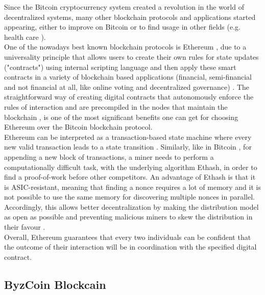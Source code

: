 Since the Bitcoin cryptocurrency system created a revolution in the world of decentralized systems, many other blockchain protocols and applications started appearing, either to improve on Bitcoin or to find usage in other fields (e.g. health care \cite{Health}).\\
\newline
One of the nowadays best known blockchain protocols is Ethereum \cite{Ethereum}, due to a universality principle that allows users to create their own rules for state updates ("contracts") using internal scripting language and then apply these smart contracts in a variety of blockchain based applications (financial, semi-financial and not financial at all, like online voting and decentralized governance) \cite{Ethereum}.
\newline
The straightforward way of creating digital contracts that autonomously enforce the rules of interaction and are precompiled in the nodes that maintain the blockchain \cite{Ethereum}, is one of the most significant benefits one can get for choosing Ethereum over the Bitcoin blockchain protocol.\\
\newline
Ethereum can be interpreted as a transaction-based state machine where every new valid transaction leads to a state transition \cite{Ethereum}. Similarly, like in Bitcoin \cite{Bitcoin}, for appending a new block of transactions, a miner needs to perform a computationally difficult task, with the underlying algorithm Ethash, in order to find a proof-of-work before other competitors. An advantage of Ethash is that it is ASIC-resistant, meaning that finding a nonce requires a lot of memory
and it is not possible to use the same memory for discovering multiple nonces in parallel. Accordingly, this allows better decentralization by making the distribution model
as open as possible and preventing malicious miners to skew the
distribution in their favour \cite{Ethereum}.\\
\newline
Overall, Ethereum guarantees that every two individuals can be confident that the outcome of their interaction will be in coordination with the specified digital contract.

\subsection{ByzCoin Blockcain} \label{ByzCoin Background}

